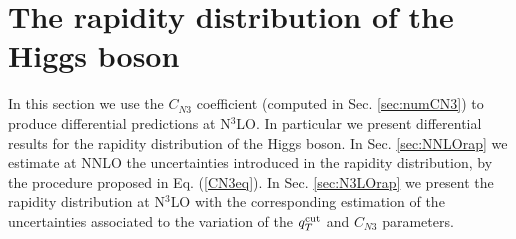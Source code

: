 \documentclass[12pt]{article}
\begin{document}
\section{The rapidity distribution of the Higgs boson}
In this section we use the $C_{N3}$ coefficient (computed in Sec. \ref{sec:numCN3}) to produce differential predictions at N$^{3}$LO. In particular we present differential results for the rapidity distribution of the Higgs boson. In Sec. \ref{sec:NNLOrap}  we estimate at NNLO the uncertainties introduced in the rapidity distribution, by the procedure proposed in Eq. (\ref{CN3eq}). In Sec. \ref{sec:N3LOrap} we present the rapidity distribution at N$^{3}$LO with the corresponding estimation of the uncertainties associated to the variation of the $q_{T}^{\rm cut}$ and $C_{N3}$ parameters.
\end{document}
